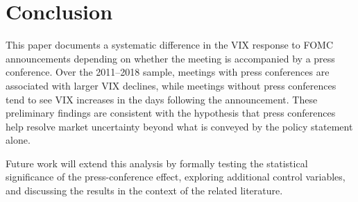 \section{Conclusion}
\label{sec:conclusion}

This paper documents a systematic difference in the VIX response to FOMC announcements depending on whether the meeting is accompanied by a press conference. Over the 2011--2018 sample, meetings with press conferences are associated with larger VIX declines, while meetings without press conferences tend to see VIX increases in the days following the announcement. These preliminary findings are consistent with the hypothesis that press conferences help resolve market uncertainty beyond what is conveyed by the policy statement alone.

Future work will extend this analysis by formally testing the statistical significance of the press-conference effect, exploring additional control variables, and discussing the results in the context of the related literature.
